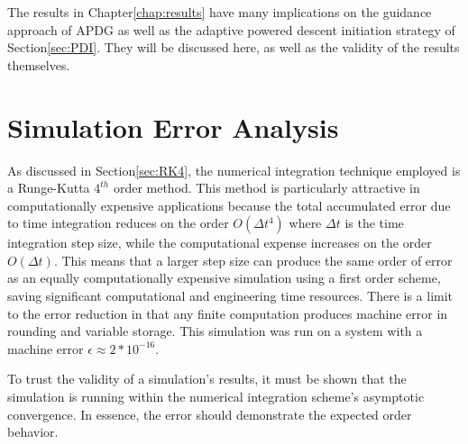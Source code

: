 The results in Chapter\:\ref{chap:results} have many implications on the guidance approach of APDG as well as the adaptive powered descent initiation strategy of Section\:\ref{sec:PDI}. They will be discussed here, as well as the validity of the results themselves.

\section{Simulation Error Analysis} \label{sec:convergence}
As discussed in Section\:\ref{sec:RK4}, the numerical integration technique employed is a Runge-Kutta $4^{th}$ order method. This method is particularly attractive in computationally expensive applications because the total accumulated error due to time integration reduces on the order $O(\Delta t^4)$ where $\Delta t$ is the time integration step size, while the computational expense increases on the order $O(\Delta t)$. This means that a larger step size can produce the same order of error as an equally computationally expensive simulation using a first order scheme, saving significant computational and engineering time resources. There is a limit to the error reduction in that any finite computation produces machine error in rounding and variable storage. This simulation was run on a system with a machine error $\epsilon \approx 2*10^{-16}$.

To trust the validity of a simulation's results, it must be shown that the simulation is running within the numerical integration scheme's asymptotic convergence. In essence, the error should demonstrate the expected order behavior. 


